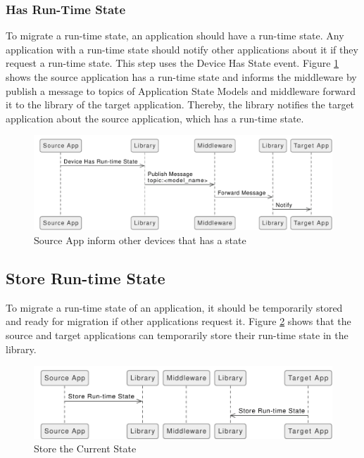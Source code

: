 \subsubsection{Has Run-Time State}
To migrate a run-time state, an application should have a run-time state. Any application with a run-time state should notify other applications about it if they request a run-time state. This step uses the Device Has State event. Figure \ref{fig:Inform-Devices-Has-State-Source} shows the source application has a run-time state and informs the middleware by publish a message to topics of Application State Models and middleware forward it to the library of the target application. Thereby, the library notifies the target application about the source application, which has a run-time state.

\FloatBarrier \begin{figure}[H]
    \includegraphics[width=\linewidth]{../figures/Inform-Devices-Has-State-Source}
    \centering
    \caption{Source App inform other devices that has a state}
    \label{fig:Inform-Devices-Has-State-Source}
\end{figure} \FloatBarrier

\subsection{Store Run-time State}
To migrate a run-time state of an application, it should be temporarily stored and ready for migration if other applications request it. Figure \ref{fig:Store-Current-State} shows that the source and target applications can temporarily store their run-time state in the library.

\FloatBarrier \begin{figure}[H]
    \includegraphics[width=\linewidth]{../figures/Store-Current-State}
    \centering
    \caption{Store the Current State}
    \label{fig:Store-Current-State}
\end{figure} \FloatBarrier


